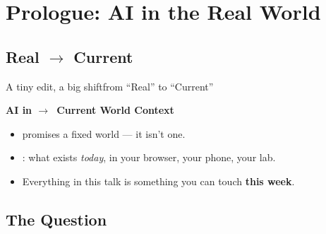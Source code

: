 
\section{Prologue: AI in the Real World}
\subsection{\texorpdfstring{Real $\rightarrow$ Current}{Real -> Current}}

\begin{frame}{A tiny edit, a big shift}{from ``Real'' to ``Current''}
    \begin{center}
        {\huge\bfseries AI in  \color{accentcyan}$\longrightarrow$\ \color{neongreen}Current \color{fgwhite}World Context}
    \end{center}
    \vspace{0.4cm}
    \pause\begin{itemize}[<+->]
        \item {} promises a fixed world --- it isn't one.
        \item {}: what exists \emph{today}, in your browser, your phone, your lab.
        \item Everything in this talk is something you can touch \textbf{this week}.
    \end{itemize}
\end{frame}

\subsection{The Question}

